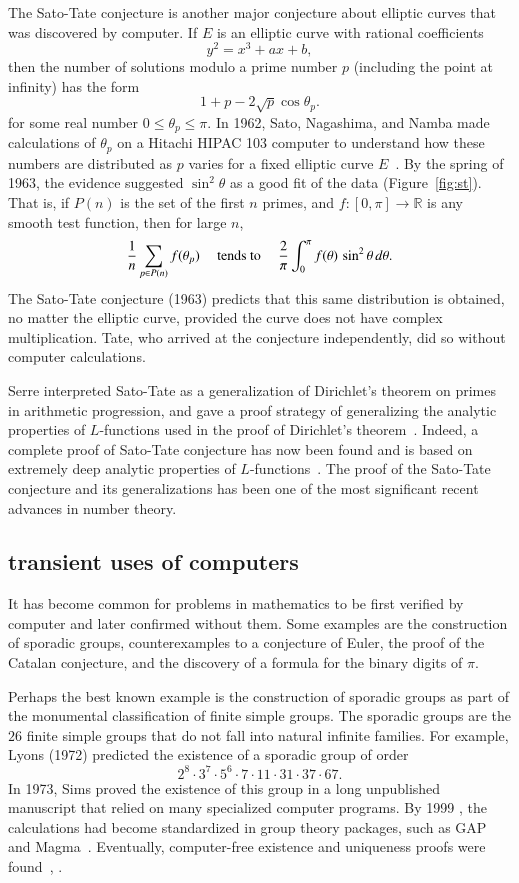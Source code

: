 \documentclass{llncs}
\newcommand{\ring}[1]{\mathbb{#1}}
\begin{document}
The Sato-Tate conjecture is another major conjecture about elliptic
curves that was discovered by computer.  If $E$ is an elliptic curve
with rational coefficients
\[
y^2 = x^3 + a x + b,
\]
then the number of solutions modulo a prime number $p$ (including the
point at infinity) has the form
\[
1 + p - 2\sqrt{p}\cos\theta_p.
\]
for some real number $0\le \theta_p\le \pi$.  In 1962, Sato,
Nagashima, and Namba made calculations  of $\theta_p$ on a Hitachi
HIPAC 103 computer to understand how these numbers are distributed as
$p$ varies for a fixed elliptic curve $E$~\cite{Sch}.  By the spring of 1963, the
evidence suggested  $\sin^2\theta$ as a good fit of the data (Figure~\ref{fig:st}).
That is, if $P(n)$ is the set of the first $n$ primes, and
$f:[0,\pi]\to\ring{R}$ is any smooth test function, then for large
$n$,
\[
\frac{1}{n}\sum_{p\in P(n)} f(\theta_p) \quad\hbox{ tends to }\quad
\frac{2}{\pi}\int_0^\pi f(\theta)\,\sin^2\theta\,d\theta.
\]
The Sato-Tate conjecture (1963) predicts that this same distribution is
obtained, no matter the elliptic curve, provided the curve does not
have complex multiplication.  Tate, who arrived at the conjecture
independently, did so without computer calculations.

Serre interpreted Sato-Tate as a generalization of Dirichlet's theorem
on primes in arithmetic progression, and gave a proof strategy of
generalizing the analytic properties of $L$-functions used in the
proof of Dirichlet's theorem~\cite{Se68}.  Indeed, a complete proof of
Sato-Tate conjecture has now been found and is based on extremely
deep analytic properties of $L$-functions~\cite{Car:Bourbaki}.  The
proof of the Sato-Tate conjecture and its generalizations has been one
of the most significant recent advances in number theory.







\subsection{transient uses of computers}

It has become common for problems in mathematics to be first verified by
computer and later confirmed without them.  Some examples are
the construction of sporadic groups, counterexamples to a conjecture
of Euler, the proof of the Catalan conjecture, and the discovery of a formula
for the binary digits of $\pi$.

Perhaps the best known example is the construction of sporadic groups as
part of the monumental classification of finite simple groups.  The
sporadic groups are the $26$ finite simple groups that do not fall into
natural infinite families.  For example,  Lyons (1972) predicted
the existence of a sporadic group of order
\[
2^ 8\cdot 3^7\cdot 5^6\cdot  7\cdot 11 \cdot 31 \cdot 37 \cdot 67.
\]
In 1973, Sims proved the existence of this group in a long unpublished
manuscript that relied on many specialized computer programs.  By 1999
, the calculations had become standardized in group theory packages,
such as GAP and Magma~\cite{HS99}.  Eventually, computer-free
existence and uniqueness proofs were found~\cite{MParker},
\cite{AS92}.
\end{document}
